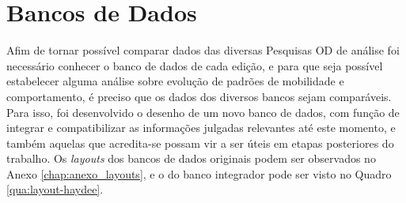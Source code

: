 \section{Bancos de Dados}\label{sec:bd}

Afim de tornar possível comparar dados das diversas Pesquisas OD de análise foi necessário conhecer o banco de dados de cada edição, e para que seja possível estabelecer alguma análise sobre evolução de padrões de mobilidade e comportamento, é preciso que os dados dos diversos bancos sejam comparáveis. Para isso, foi desenvolvido o desenho de um novo banco de dados, com função de integrar e compatibilizar as informações julgadas relevantes até este momento, e também aquelas que acredita-se possam vir a ser úteis em etapas posteriores do trabalho. Os \emph{layouts} dos bancos de dados originais podem ser observados no Anexo \ref{chap:anexo_layouts}, e o do  banco integrador pode ser visto no Quadro \ref{qua:layout-haydee}.

